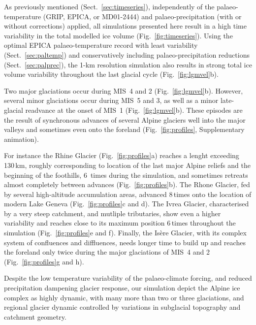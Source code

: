 \documentclass[tc, manuscript]{copernicus}
\begin{document}
    As previously mentioned (Sect.~\ref{sec:timeseries}), independently of the
    palaeo-temperature (GRIP, EPICA, or MD01-2444) and palaeo-precipitation
    (with or without corrections) applied, all simulations presented here
    result in a high time variability in the total modelled ice volume
    (Fig.~\ref{fig:timeseries}). Using the optimal EPICA palaeo-temperature
    record with least variability (Sect.~\ref{sec:paltemp}) and conservatively
    including palaeo-precipitation reductions (Sect.~\ref{sec:palprec}), the
    1-km resolution simulation also results in strong total ice volume
    variability throughout the last glacial cycle (Fig.~\ref{fig:lgmvel}b).

    Two major glaciations occur during MIS~4 and 2 (Fig.~\ref{fig:lgmvel}b).
    However, several minor glaciations occur during MIS~5 and 3, as well as a
    minor late-glacial readvance at the onset of MIS~1
    (Fig.~\ref{fig:lgmvel}b). These episodes are the result of synchronous
    advances of several Alpine glaciers well into the major valleys and sometimes
    even onto the foreland (Fig.~\ref{fig:profiles}, Supplementary animation).

    For instance the Rhine Glacier (Fig.~\ref{fig:profiles}a) reaches a lenght
    exceeding 130\,km, roughly corresponding to location of the last major
    Alpine reliefs and the beginning of the foothills, 6~times during the
    simulation, and sometimes retreats almost completely between advances
    (Fig.~\ref{fig:profiles}b). The Rhone Glacier, fed by several high-altitude
    accumulation areas, advanced 8\,times onto the location of modern Lake
    Geneva (Fig.~\ref{fig:profiles}c and d). The Ivrea Glacier, characterised
    by a very steep catchment, and mutliple tributaries, show even a higher
    variability and reaches close to its maximum position 6\,times throughout
    the simulation (Fig.~\ref{fig:profiles}e and f). Finally, the Isère
    Glacier, with its complex system of confluences and diffluences, needs
    longer time to build up and reaches the foreland only twice during the
    major glaciations of MIS~4 and 2 (Fig.~\ref{fig:profiles}g and h).

    Despite the low temperature variability of the palaeo-climate forcing, and
    reduced precipitation dampening glacier response, our simulation depict
    the Alpine ice complex as highly dynamic, with many more than two or three
    \citep[cf.][]{Preusser.2004,Ivy-Ochs.etal.2008} glaciations, and regional
    glacier dynamic controlled by variations in subglacial topography and
    catchment geometry.
\end{document}
